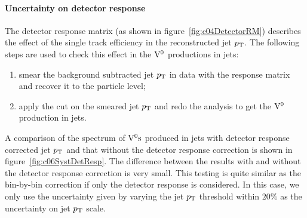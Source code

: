 \paragraph{Uncertainty on detector response}
The detector response matrix (as shown in figure~\ref{fig:c04DetectorRM})
describes the effect of the  single track efficiency in the reconstructed
jet $p_{\rm T}$.
The following steps are used to check this effect in the ${\rm V}^{0}$ productions
in jets:
\begin{enumerate}
\item smear the background subtracted jet $p_{\rm T}$ in data with the response
      matrix and recover it to the particle level;
\item apply the cut on the smeared jet $p_{\rm T}$ and redo the analysis to get
      the ${\rm V}^{0}$ production in jets.
\end{enumerate}
A comparison of the spectrum of ${\rm V}^{0}{\rm s}$ produced in jets with detector
response corrected jet $p_{\rm T}$ and that without the detector response
correction is shown in figure~\ref{fig:c06SystDetResp}.
The difference between the results with and without the detector response
correction is very small.
This testing is quite similar as the bin-by-bin correction if only the
detector response is considered.
In this case, we only use the uncertainty given by varying the
jet $p_{\rm T}$ threshold within $20\%$ as the uncertainty on jet $p_{\rm T}$ scale.
